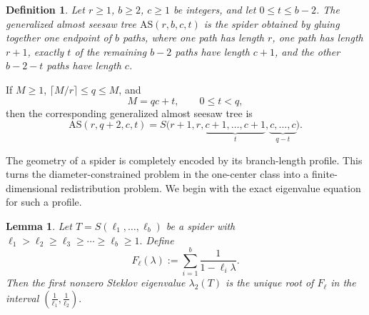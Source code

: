\documentclass[11pt]{article}
\newtheorem{lemma}[theorem]{Lemma}
\newtheorem{definition}[theorem]{Definition}
\theoremstyle{remark}
\newcommand{\AS}{\mathrm{AS}}
\begin{document}
\begin{definition}
Let $r\ge 1$, $b\ge 2$, $c\ge 1$ be integers, and let $0\le t\le b-2$. The generalized almost
seesaw tree $\AS(r,b,c,t)$ is the spider obtained by gluing together one endpoint of $b$ paths,
where one path has length $r$, one path has length $r+1$, exactly $t$ of the remaining $b-2$
paths have length $c+1$, and the other $b-2-t$ paths have length $c$.
\end{definition}

If $M\ge 1$, $\lceil M/r\rceil\le q\le M$, and
$$
M=qc+t,\qquad 0\le t<q,
$$
then the corresponding generalized almost seesaw tree is
$$
\AS(r,q+2,c,t)=S\bigl(r+1,r,\underbrace{c+1,\dots,c+1}_{t},\underbrace{c,\dots,c}_{q-t}\bigr).
$$

The geometry of a spider is completely encoded by its branch-length profile. This turns the diameter-constrained problem in the one-center class into a finite-dimensional redistribution problem. We begin with the exact eigenvalue equation for such a profile.

\begin{lemma}\label{lem:spider-equation}
Let $T=S(\ell_1,\dots,\ell_b)$
be a spider with $\ell_1>\ell_2\ge \ell_3\ge \cdots \ge \ell_b\ge 1.$
Define $$
F_{\ell}(\lambda):=\sum_{i=1}^b \frac{1}{1-\ell_i\lambda}.
$$
Then the first nonzero Steklov eigenvalue $\lambda_2(T)$ is the unique root of $F_{\ell}$
in the interval $\left(\frac1{\ell_1},\frac1{\ell_2}\right).$
\end{lemma}
\end{document}
